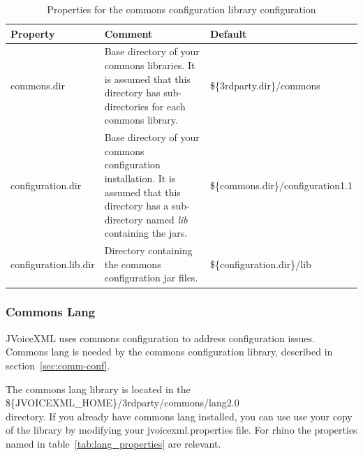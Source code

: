 \documentclass[11pt,a4paper]{article}
\begin{document}
\begin{table}[h]
\caption{Properties for the commons configuration library configuration}
\label{tab:configuration_properties}

\begin{center}

\begin{tabular}{|l|p{4cm}|l|}
\hline
\textbf{Property} & \textbf{Comment} & \textbf{Default} \\
\hline
\hline
commons.dir & 
Base directory of your commons libraries. It is assumed
that this directory has sub-directories for each
commons library.
& \$\{3rdparty.dir\}/commons \\
\hline
configuration.dir & 
Base directory of your commons configuration installation.
It is assumed that this directory
has a sub-directory named \emph{lib} containing the jars.
& \$\{commons.dir\}/configuration1.1 \\
\hline
configuration.lib.dir & 
Directory containing the commons configuration jar files.
& \$\{configuration.dir\}/lib \\
\hline
\end{tabular}

\end{center}

\end{table}

\subsubsection{Commons Lang}
\label{sec:commons-lang}

JVoiceXML uses commons configuration to address configuration
issues. Commons lang is needed by the commons configuration library,
described in section~\ref{sec:comm-conf}.

The commons lang library is located in the \\
\$\{JVOICEXML\_HOME\}/3rdparty/commons/lang2.0 \\
directory. If you already have commons lang installed, you can use
use your copy of the library by modifying your jvoicexml.properties file.
For rhino the properties named in table~\ref{tab:lang_properties} are 
relevant.
\end{document}
